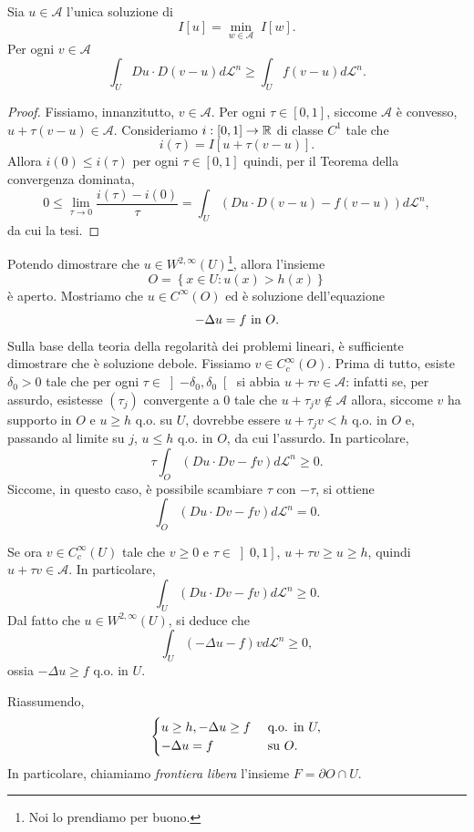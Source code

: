 \begin{teorema}
Sia $u \in \mathcal{A}$ l'unica soluzione di
\[ I[u] =  \underset{w \in \mathcal{A}}{\min}\; I[w]. \]
Per ogni $v \in \mathcal{A}$ 
\[ \int_U Du\cdot D(v-u) d\mathcal{L}^n \ge \int_U f(v-u) d\mathcal{L}^n. \]
\end{teorema}
\begin{proof}
Fissiamo, innanzitutto, $v \in \mathcal{A}$. Per ogni $\tau \in [0,1]$, siccome $\mathcal{A}$ è convesso, $u+\tau(v-u) \in \mathcal{A}$. Consideriamo $i: [0,1]\to \mathbb{R}$ di classe $C^1$ tale che 
\[ i(\tau) = I[u+\tau(v-u)]. \]
Allora $i(0)\le i(\tau)$ per ogni $\tau \in [0,1]$ quindi, per il Teorema della convergenza dominata,
\[ 0 \le \lim\limits_{\tau \to 0} \frac{i(\tau)- i(0)}{\tau} = \int_U \left( Du\cdot D(v-u) -f(v-u)\right) d\mathcal{L}^n, \]
da cui la tesi.
\end{proof}

Potendo dimostrare che $u \in W^{2,\infty}(U)$\footnote{Noi lo prendiamo per buono.}, allora l'insieme
\[ O= \left\lbrace x \in U: u(x) > h(x)\right\rbrace  \]
è aperto. Mostriamo che $u \in C^\infty(O)$ ed è soluzione dell'equazione 
\[ -\Delta u = f \textup{ in } O. \]
Sulla base della teoria della regolarità dei problemi lineari, è sufficiente dimostrare che è soluzione debole. Fissiamo $v \in C^\infty_c(O)$. Prima di tutto, esiste $\delta_0 >0$ tale che per ogni $\tau \in \left] -\delta_0,\delta_0\right[$ si abbia $u+\tau v \in \mathcal{A}$: infatti se, per assurdo, esistesse $(\tau_j)$ convergente a $0$ tale che $u+\tau_j v \notin \mathcal{A}$ allora, siccome $v$ ha supporto in $O$ e $u\ge h$ q.o. su $U$, dovrebbe essere $u + \tau_j v <h$ q.o. in $O$ e, passando al limite su $j$, $u \le h$ q.o. in $O$, da cui l'assurdo. In particolare, 
\[ \tau \int_O\left( Du\cdot Dv - fv\right) d\mathcal{L}^n \ge 0. \]
Siccome, in questo caso, è possibile scambiare $\tau$ con $-\tau$, si ottiene
\[ \int_O\left( Du\cdot Dv - fv\right) d\mathcal{L}^n = 0. \]

Se ora $v \in C^\infty_c(U)$ tale che $v \ge 0$ e $\tau \in \left] 0,1\right] $, $u +\tau v \ge u \ge h$, quindi $u+\tau v \in \mathcal{A}$. In particolare, 
\[ \int_U \left( Du\cdot Dv - fv\right) d\mathcal{L}^n \ge 0. \]
Dal fatto che $u \in W^{2,\infty}(U)$, si deduce che 
\[ \int_U \left( -\Delta u - f\right)v d\mathcal{L}^n \ge 0, \]
ossia $-\Delta u \ge f$ q.o. in $U$.

Riassumendo, 
\[ \begin{cases}
	u\ge h, -\Delta u \ge f & \textup{ q.o. in } U,\\
	-\Delta u = f & \textup{ su } O.
\end{cases} \]
In particolare, chiamiamo \emph{frontiera libera} l'insieme $F = \partial O \cap U$.

